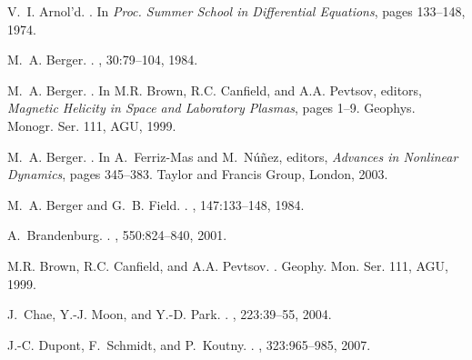 
\begin{thebibliography}{10}

V.~I. {Arnol'd}.
.
\newblock In {\em Proc. Summer School in Differential Equations}, pages
  133--148, 1974.

M.~A. {Berger}.
.
, 30:79--104, 1984.

M.~A. {Berger}.
.
\newblock In M.R. {Brown}, R.C. {Canfield}, and A.A. {Pevtsov}, editors, {\em
  Magnetic Helicity in Space and Laboratory Plasmas}, pages 1--9. Geophys.
  Monogr. Ser. 111, AGU, 1999.

M.~A. {Berger}.
.
\newblock In A.~{Ferriz-Mas} and M.~{N{\'u}{\~n}ez}, editors, {\em Advances in
  Nonlinear Dynamics}, pages 345--383. Taylor and Francis Group, London, 2003.

M.~A. {Berger} and G.~B. {Field}.
.
, 147:133--148, 1984.

A.~{Brandenburg}.
.
, 550:824--840, 2001.

M.R. {Brown}, R.C. {Canfield}, and A.A. {Pevtsov}.
.
\newblock Geophy. Mon. Ser. 111, AGU, 1999.

J.~{Chae}, Y.-J. {Moon}, and Y.-D. {Park}.
.
, 223:39--55, 2004.

J.-C. {Dupont}, F.~{Schmidt}, and P.~{Koutny}.
.
, 323:965--985, 2007.


\end{thebibliography}
